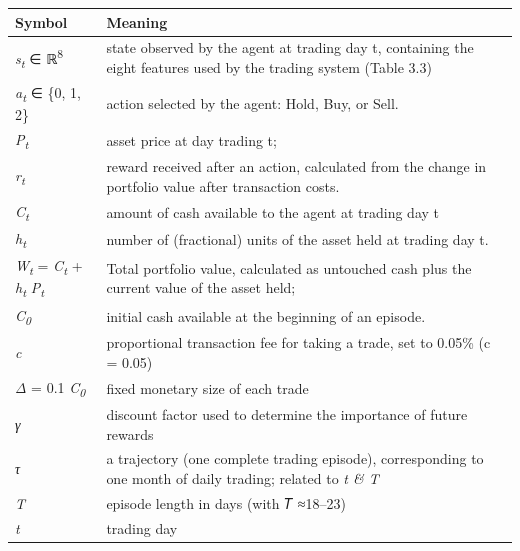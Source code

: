 {\def\LTcaptype{none} %
\begin{longtable}[]{@{}
  >{\raggedright\arraybackslash}p{}
  >{\raggedright\arraybackslash}p{}@{}}
\toprule\noalign{}
\begin{minipage}[b]{\linewidth}\raggedright
\textbf{Symbol}
\end{minipage} & \begin{minipage}[b]{\linewidth}\raggedright
\textbf{Meaning}
\end{minipage} \\
\midrule\noalign{}
\endhead
\bottomrule\noalign{}
\endlastfoot
\emph{s\textsubscript{t}} ∈ ℝ\textsuperscript{8} & state observed by the
agent at trading day t, containing the eight features used by the
trading system (Table 3.3) \\
\emph{a\textsubscript{t}} ∈ \{0, 1, 2\} & action selected by the agent:
Hold, Buy, or Sell. \\
\emph{P\textsubscript{t}} & asset price at day trading t; \\
\emph{r\textsubscript{t}} & reward received after an action, calculated
from the change in portfolio value after transaction costs. \\
\emph{C\textsubscript{t}} & amount of cash available to the agent at
trading day t \\
\emph{h\textsubscript{t}} & number of (fractional) units of the asset
held at trading day t. \\
\emph{W\textsubscript{t}} = \emph{C\textsubscript{t}} +
\emph{h\textsubscript{t}} \emph{P\textsubscript{t}} & Total portfolio
value, calculated as untouched cash plus the current value of the asset
held; \\
\emph{C\textsubscript{0}} & initial cash available at the beginning of
an episode. \\
\emph{c} & proportional transaction fee for taking a trade, set to
0.05\% (c = 0.05) \\
\emph{Δ} = 0.1 \emph{C\textsubscript{0}} & fixed monetary size of each
trade \\
\emph{γ} & discount factor used to determine the importance of future
rewards \\
\emph{τ} & a trajectory (one complete trading episode), corresponding to
one month of daily trading; related to \emph{t \& T} \\
\emph{T} & episode length in days (with 𝑇 ≈18--23) \\
\emph{t} & 1 trading day \\

\end{longtable}}
